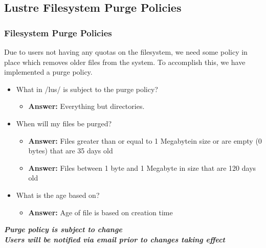 \subsection{Lustre Filesystem Purge Policies}
\begin{frame}
\frametitle{{\lustre} Filesystem Purge Policies}
Due to users not having any quotas on the {\lustre} filesystem, we need some policy in place which removes older files from the system.  To accomplish this, we have implemented a purge policy.

\begin{itemize}
\item What in \ctilde/lus/ is subject to the purge policy?
   \begin{itemize}
   \item \textbf{Answer:} Everything but directories.
   \end{itemize}
\item When will my files be purged?
  \begin{itemize}  
    \item \textbf{Answer:} Files greater than or equal to 1 Megabytein size  or are empty (0 bytes) that are 35 days old
    \item \textbf{Answer:} Files between 1 byte and 1 Megabyte in size that are 120 days old
  \end{itemize}
\item What is the age based on?
   \begin{itemize}
   \item \textbf{Answer:} Age of file is based on creation time
   \end{itemize}
  
\end{itemize}
\btVFill
\begin{center}
\footnotesize \textbf{\emph{Purge policy is subject to change~\\Users will be notified via email prior to changes taking effect}}
\end{center}
\end{frame}
